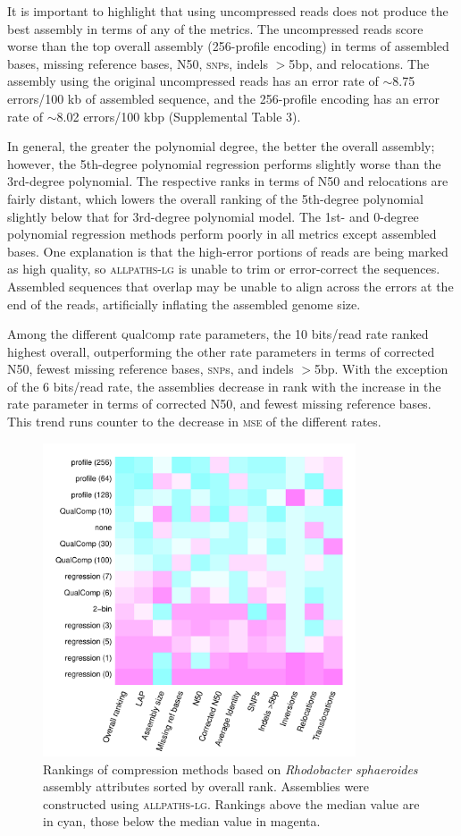 \documentclass{bioinfo}
\begin{document}
It is important to highlight that using uncompressed reads does not
produce the best assembly in terms of any of the metrics. The
uncompressed reads score worse than the top overall assembly
(256-profile encoding) in terms of assembled bases, missing reference
bases, N50, \textsc{snp}s, indels $>$5bp, and relocations. The
assembly using the original uncompressed reads has an error rate of
$\sim$8.75 errors/100 kb of assembled sequence, and the 256-profile
encoding has an error rate of $\sim$8.02 errors/100 kbp (Supplemental
Table 3).

In general, the greater the polynomial degree, the better the overall
assembly; however, the 5th-degree polynomial regression performs
slightly worse than the 3rd-degree polynomial. The respective ranks in
terms of N50 and relocations are fairly distant, which lowers the
overall ranking of the 5th-degree polynomial slightly below that for
3rd-degree polynomial model. The 1st- and 0-degree polynomial
regression methods perform poorly in all metrics except assembled
bases. One explanation is that the high-error portions of reads are
being marked as high quality, so \textsc{allpaths-lg} is unable to
trim or error-correct the sequences. Assembled sequences that overlap
may be unable to align across the errors at the end of the reads,
artificially inflating the assembled genome size.

Among the different \textsc{q}ual\textsc{c}omp rate parameters, the 10
bits/read rate ranked highest overall, outperforming the other rate
parameters in terms of corrected N50, fewest missing reference bases,
\textsc{snp}s, and indels $>$5bp. With the exception of the 6
bits/read rate, the assemblies decrease in rank with the increase in
the rate parameter in terms of corrected N50, and fewest missing
reference bases. This trend runs counter to the decrease in
\textsc{mse} of the different rates.

\begin{figure}[!tbp]
\centerline{\includegraphics[width=3.65in]{rhodo_assembly_results.pdf}}
\caption{Rankings of compression methods based on \textit{Rhodobacter
    sphaeroides} assembly attributes sorted by overall
  rank. Assemblies were constructed using \textsc{allpaths-lg}.
  Rankings above the median value are in cyan, those below the median
  value in magenta.}
  \label{fig:assembly_ranks}
\end{figure}
\end{document}
